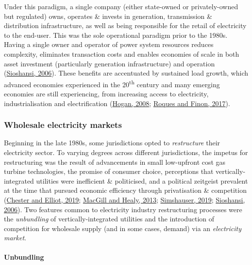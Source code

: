 \documentclass[12pt,a4paper,]{report}
\begin{document}
Under this paradigm, a single company (either state-owned or
privately-owned but regulated) owns, operates \& invests in generation,
transmission \& distribution infrastructure, as well as being
responsible for the retail of electricity to the end-user. This was the
sole operational paradigm prior to the 1980s. Having a single owner and
operator of power system resources reduces complexity, eliminates
transaction costs and enables economies of scale in both asset
investment (particularly generation infrastructure) and operation
(\protect\hyperlink{ref-sioshansiElectricityMarketReform2006}{Sioshansi,
2006}). These benefits are accentuated by sustained load growth, which
advanced economies experienced in the 20\textsuperscript{th} century and
many emerging economies are still experiencing, from increasing access
to electricity, industrialisation and electrification
(\protect\hyperlink{ref-hoganElectricityMarketStructure2008}{Hogan,
2008};
\protect\hyperlink{ref-roquesAdaptingElectricityMarkets2017}{Roques and
Finon, 2017}).

\hypertarget{wholesale-electricity-markets}{%
\subsubsection{Wholesale electricity
markets}\label{wholesale-electricity-markets}}

Beginning in the late 1980s, some jurisdictions opted to
\emph{restructure} their electricity sector. To varying degrees across
different jurisdictions, the impetus for restructuring was the result of
advancements in small low-upfront cost gas turbine technologies, the
promise of consumer choice, perceptions that vertically-integrated
utilities were inefficient \& politicised, and a political zeitgeist
prevalent at the time that pursued economic efficiency through
privatisation \& competition
(\protect\hyperlink{ref-chesterEnergyProblemRepresentation2019}{Chester
and Elliot, 2019};
\protect\hyperlink{ref-macgillElectricityIndustryReform2013}{MacGill and
Healy, 2013};
\protect\hyperlink{ref-simshauserLessonsAustraliaNational2019}{Simshauser,
2019};
\protect\hyperlink{ref-sioshansiElectricityMarketReform2006}{Sioshansi,
2006}). Two features common to electricity industry restructuring
processes were the \emph{unbundling} of vertically-integrated utilities
and the introduction of competition for wholesale supply (and in some
cases, demand) via an \emph{electricity market}.

\hypertarget{unbundling}{%
\paragraph{Unbundling}\label{unbundling}}
\end{document}
